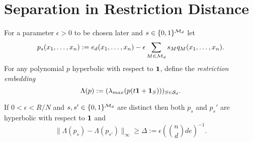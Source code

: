 \newcommand{\rdist}{\mathsf{rdist}}
\newcommand{\lmax}{\lambda_{max}}
\section{Separation in Restriction Distance}
For a parameter $\epsilon>0$ to be chosen later and $s\in\{0,1\}^{\mathcal{M}_d}$ let
$$p_s(x_1,\ldots,x_n):=e_d(x_1,\ldots,x_n)-\epsilon\sum_{M\in\mathcal{M}_d} s_M q_M(x_1,\ldots,x_n).$$
For any polynomial $p$ hyperbolic with respect to $\mathbf{1}$, define the {\em restriction embedding}
$$ \Lambda(p):=(\lmax(p(t\one+\one_S)))_{S\in\S_d}.$$

\begin{lemma} \label{lem:restrictfar} If $0<\epsilon<R/N$ and $s,s'\in\{0,1\}^{\mathcal{M}_d}$ are distinct then both $p_s$ and $p_s'$ are hyperbolic
with respect to $\mathbf{1}$ and
$$\|\Lambda(p_s)-\Lambda(p_{s'})\|_\infty\ge \Delta:=\epsilon \left(\binom{n}{d} d e\right)^{-1}.$$
\end{lemma}

